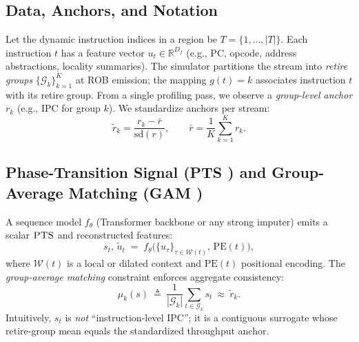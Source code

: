 \documentclass[conference]{IEEEtran}
\newcommand{\pts}{\textsc{PTS} }
\newcommand{\gam}{\textsc{GAM} }
\begin{document}
\subsection{Data, Anchors, and Notation}
Let the dynamic instruction indices in a region be \(T=\{1,\ldots,|T|\}\). Each instruction \(t\) has a feature vector \(u_t\in\mathbb{R}^{D_f}\) (e.g., PC, opcode, address abstractions, locality summaries). The simulator partitions the stream into \emph{retire groups} \(\{\mathcal{G}_k\}_{k=1}^K\) at ROB emission; the mapping \(g(t)=k\) associates instruction \(t\) with its retire group. From a single profiling pass, we observe a \emph{group-level anchor} \(r_k\) (e.g., IPC for group \(k\)). We standardize anchors per stream:
\[
\tilde{r}_k=\frac{r_k-\bar{r}}{\mathrm{sd}(r)},\qquad \bar{r}=\frac{1}{K}\sum_{k=1}^{K}r_k.
\]

\subsection{Phase-Transition Signal (\pts) and Group-Average Matching (\gam)}
A sequence model \(f_\theta\) (Transformer backbone or any strong imputer) emits a scalar \(\pts\) and reconstructed features:
\[
s_t,\,\tilde{u}_t \;=\; f_\theta\!\big(\{u_\tau\}_{\tau\in\mathcal{W}(t)},\,\mathrm{PE}(t)\big),
\]
where \(\mathcal{W}(t)\) is a local or dilated context and \(\mathrm{PE}(t)\) positional encoding. The \emph{group-average matching} constraint enforces aggregate consistency:
\begin{equation}
\mu_k(s)\ \triangleq\ \frac{1}{|\mathcal{G}_k|}\sum_{t\in\mathcal{G}_k}s_t\ \approx\ \tilde{r}_k.
\label{eq:group-avg}
\end{equation}
Intuitively, \(s_t\) is \emph{not} “instruction-level IPC”; it is a contiguous surrogate whose retire-group mean equals the standardized throughput anchor.
\end{document}
